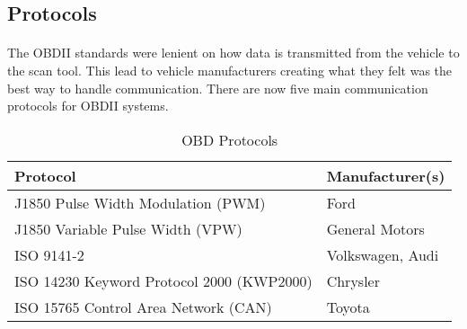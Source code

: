 	\subsection{Protocols}{
		\paragraph{}{
		The OBDII standards were lenient on how data is transmitted from the vehicle to the scan tool. This lead to vehicle manufacturers creating what they felt was the best way to handle communication. There are now five main communication protocols for OBDII systems.
		\begin{table}[h]
			\begin{center}				
				\begin{tabular}{| l | l |}
				\hline
				\textbf{Protocol} & \textbf{Manufacturer(s)}\\
				\hline
				J1850 Pulse Width Modulation (PWM) & Ford\\
				\hline
				J1850 Variable Pulse Width (VPW) & General Motors\\
				\hline
				ISO 9141-2 & Volkswagen, Audi\\
				\hline
				ISO 14230 Keyword Protocol 2000 (KWP2000) & Chrysler\\
				\hline
				ISO 15765 Control Area Network (CAN) & Toyota\\
				\hline			
				\end{tabular}
				\caption{OBD Protocols}
				\label{tab:Protocols}
			\end{center}
		\end{table}	
		}		
}
